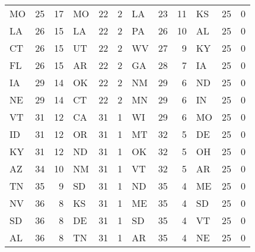 \begin{longtable}{lrr|lrr||lrr|lrr}
        MO &   25 &            17 &            MO &   22 &             2 &             LA &   23 &            11 &            KS &   25 &             0 \\
        LA &   26 &            15 &            LA &   22 &             2 &             PA &   26 &            10 &            AL &   25 &             0 \\
        CT &   26 &            15 &            UT &   22 &             2 &             WV &   27 &             9 &            KY &   25 &             0 \\
        FL &   26 &            15 &            AR &   22 &             2 &             GA &   28 &             7 &            IA &   25 &             0 \\
        IA &   29 &            14 &            OK &   22 &             2 &             NM &   29 &             6 &            ND &   25 &             0 \\
        NE &   29 &            14 &            CT &   22 &             2 &             MN &   29 &             6 &            IN &   25 &             0 \\
        VT &   31 &            12 &            CA &   31 &             1 &             WI &   29 &             6 &            MO &   25 &             0 \\
        ID &   31 &            12 &            OR &   31 &             1 &             MT &   32 &             5 &            DE &   25 &             0 \\
        KY &   31 &            12 &            ND &   31 &             1 &             OK &   32 &             5 &            OH &   25 &             0 \\
        AZ &   34 &            10 &            NM &   31 &             1 &             VT &   32 &             5 &            AR &   25 &             0 \\
        TN &   35 &             9 &            SD &   31 &             1 &             ND &   35 &             4 &            ME &   25 &             0 \\
        NV &   36 &             8 &            KS &   31 &             1 &             ME &   35 &             4 &            SD &   25 &             0 \\
        SD &   36 &             8 &            DE &   31 &             1 &             SD &   35 &             4 &            VT &   25 &             0 \\
        AL &   36 &             8 &            TN &   31 &             1 &             AR &   35 &             4 &            NE &   25 &             0 \\

\end{longtable}
